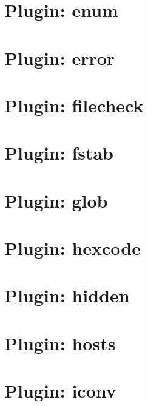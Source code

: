 \documentclass[twoside]{book}
\newcommand{\+}{\discretionary{\mbox{\scriptsize$\hookleftarrow$}}{}{}}
\begin{document}
\chapter{Plugin\+: enum}
\label{md_src_plugins_enum_README}
\hypertarget{md_src_plugins_enum_README}{}

\chapter{Plugin\+: error}
\label{md_src_plugins_error_README}
\hypertarget{md_src_plugins_error_README}{}

\chapter{Plugin\+: filecheck}
\label{md_src_plugins_filecheck_README}
\hypertarget{md_src_plugins_filecheck_README}{}

\chapter{Plugin\+: fstab}
\label{md_src_plugins_fstab_README}
\hypertarget{md_src_plugins_fstab_README}{}

\chapter{Plugin\+: glob}
\label{md_src_plugins_glob_README}
\hypertarget{md_src_plugins_glob_README}{}

\chapter{Plugin\+: hexcode}
\label{md_src_plugins_hexcode_README}
\hypertarget{md_src_plugins_hexcode_README}{}

\chapter{Plugin\+: hidden}
\label{md_src_plugins_hidden_README}
\hypertarget{md_src_plugins_hidden_README}{}

\chapter{Plugin\+: hosts}
\label{md_src_plugins_hosts_README}
\hypertarget{md_src_plugins_hosts_README}{}

\chapter{Plugin\+: iconv}
\label{md_src_plugins_iconv_README}
\hypertarget{md_src_plugins_iconv_README}{}

\end{document}
